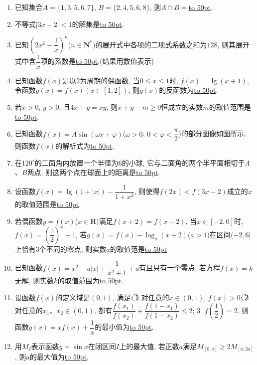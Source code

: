 \documentclass[10pt,a4paper]{article}
\newcommand{\blank}[1]{\underline{\hbox to #1pt{}}}
\begin{document}
\begin{enumerate}[1.]
\item 已知集合$A=\{1,3,5,6,7\}$, $B=\{2,4,5,6,8\}$, 则$A\cap B=$\blank{50}.
\item 不等式$|3x-2|<1$的解集是\blank{50}.
\item 已知$(2x^2-\dfrac 1x)^n$($n\in \mathbf{N}^*)$的展开式中各项的二项式系数之和为$128$, 则其展开式中含$\dfrac 1x$项的系数是\blank{50}.(结果用数值表示)
\item 已知函数$f(x)$是以$2$为周期的偶函数, 当$0\le x\le 1$时, $f(x)=\lg (x+1)$, 令函数$g(x)=f(x)(x\in [1,2])$, 则$g(x)$的反函数为\blank{50}.
\item 若$x>0$, $y>0$, 且$4x+y=xy$, 则$x+y-m\ge 0$恒成立的实数$m$的取值范围是\blank{50}.
\item 已知函数$f(x)=A\sin (\omega x+\varphi)$($\omega >0$, $0<\varphi <\dfrac{\pi }2$)的部分图像如图所示, 则函数$f(x)$的解析式为\blank{50}.
\begin{center}
\end{center}
\item 在$120^\circ$的二面角内放置一个半径为$6$的小球, 它与二面角的两个半平面相切于$A$、$B$两点, 则这两个点在球面上的距离是\blank{50}.
\item 设函数$f(x)=\lg (1+|x|)-\dfrac 1{1+x^2}$, 则使得$f(2x)<f(3x-2)$成立的$x$的取值范围是\blank{50}.
\item 若偶函数$y=f(x)$($x\in \mathbf{R}$)满足$f(x+2)=f(x-2)$, 当$x\in [-2,0]$时, $f(x)=(\dfrac 12)^x-1$, 若$g(x)=f(x)-\log_a(x+2)$($a>1$)在区间$(-2,6]$上恰有$3$个不同的零点, 则实数$a$的取值范是\blank{50}
\item 已知函数$f(x)=x^2-a|x|+\dfrac 1{x^2+1}+a$有且只有一个零点, 若方程$f(x)=k$无解, 则实数$k$的取值范围为\blank{50}.
\item 设函数$f(x)$的定义域是$(0,1)$, 满足: \textcircled{1} 对任意的$x\in (0,1)$, $f(x)>0$; \textcircled{2} 对任意的$x_1$、$x_2\in (0,1)$, 都有$\dfrac{f(x_1)}{f(x_2)}+\dfrac{f(1-x_1)}{f(1-x_2)}\le 2$; \textcircled{3} $f(\dfrac 12)=2$. 则函数$g(x)=xf(x)+\dfrac 1x$的最小值为\blank{50}.
\item 用$M_I$表示函数$y=\sin x$在闭区间$I$上的最大值, 若正数$a$满足$M_{[0,a]}\ge 2M_{[a,2a]}$, 则$a$的最大值为\blank{50}.

\end{enumerate}
\end{document}
